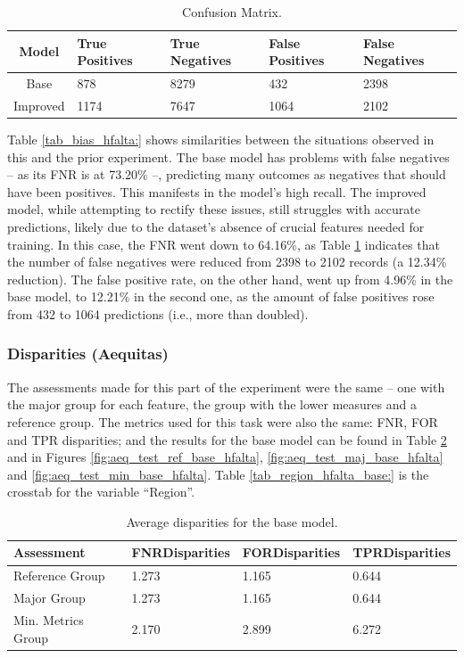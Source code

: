 \documentclass[fleqn,10pt]{wlscirep}
\begin{document}
\begin{table}[!htb]
\centering
\begin{tabular}{|c|p{3cm}|p{3cm}|p{3cm}|p{3cm}|}
        \hline
        \textbf{Model} & \textbf{True Positives} & \textbf{True Negatives} & \textbf{False Positives} & \textbf{False Negatives}\\ \hline
        Base & 878 & 8279 & 432 & 2398  \\ 
        Improved & 1174 & 7647 & 1064 & 2102  \\ 
        \hline
    \end{tabular}
\caption{Confusion Matrix.}
\label{tab_cm_hfalta:}
\end{table}

Table \ref{tab_bias_hfalta:} shows similarities between the situations observed in this and the prior experiment. The base model has problems with false negatives -- as its FNR is at 73.20\% --, predicting many outcomes as negatives that should have been positives. This manifests in the model's high recall. The improved model, while attempting to rectify these issues, still struggles with accurate predictions, likely due to the dataset's absence of crucial features needed for training. In this case, the FNR went down to 64.16\%, as Table \ref{tab_cm_hfalta:} indicates that the number of false negatives were reduced from 2398 to 2102 records (a 12.34\% reduction). The false positive rate, on the other hand, went up from 4.96\% in the base model, to 12.21\% in the second one, as the amount of false positives rose from 432 to 1064 predictions (i.e., more than doubled). 

\subsubsection{Disparities (Aequitas)}

The assessments made for this part of the experiment were the same -- one with the major group for each feature, the group with the lower measures and a reference group. The metrics used for this task were also the same: FNR, FOR and TPR disparities; and the results for the base model can be found in Table \ref{tab_asses_base_hfalta:} and in Figures \ref{fig:aeq_test_ref_base_hfalta}, \ref{fig:aeq_test_maj_base_hfalta} and \ref{fig:aeq_test_min_base_hfalta}. Table \ref{tab_region_hfalta_base:} is the crosstab for the variable ``Region''.

\begin{table}[!htb]
\centering
\begin{tabular}{|p{70pt}|p{2cm}|p{2cm}|p{2cm}|}
\hline
        \textbf{Assessment} & \textbf{FNR\break Disparities} & \textbf{FOR\break Disparities} & \textbf{TPR\break Disparities} \\ \hline
        Reference Group & 1.273 & 1.165 & 0.644   \\
        Major Group & 1.273 & 1.165 & 0.644 \\ 
        Min. Metrics Group & 2.170 & 2.899 & 6.272 \\ 
        \hline
    \end{tabular}
\caption{Average disparities for the base model.}
\label{tab_asses_base_hfalta:}
\end{table}
\end{document}
